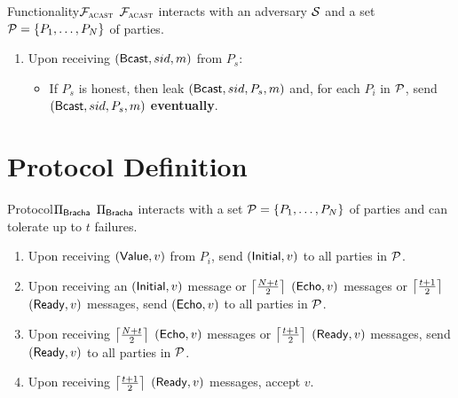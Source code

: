 \documentclass{llncs}
\begin{document}
\begin{boxdef}{Functionality}{$\mathcal{{F}}_{\textsc{acast}}$}
  $\mathcal{{F}}_{\textsc{acast}}$ interacts with an adversary $\mathcal{{S}}$ and a set $\mathcal{{P}} = \{
  P_1, \ldots, P_N \}$ of parties.
  \begin{enumerate}
    \item Upon receiving $({\sf Bcast}, sid, m)$ from $P_s$:
    
    \begin{itemize}
      \item If $P_s$ is honest, then leak $({\sf Bcast}, sid, P_s, m)$ and, for each $P_i$ in $\mathcal{{P}}$, send $({\sf
      Bcast}, sid, P_s, m)$ {\bf eventually}.
      \end{itemize}
  \end{enumerate}
\end{boxdef}

\begin{comment}
\begin{boxdef}{ILC}{$\Func{acast}$}

\end{boxdef}
\end{comment}

\section{Protocol Definition}

\begin{boxdef}{Protocol}{$\Pi_{\sf Bracha}$}
  $\Pi_{\sf Bracha}$ interacts with a set $\mathcal{{P}} = \{ P_1, \ldots, P_N \}$ of
  parties and can tolerate up to $t$ failures.
  \begin{enumerate}
    \item Upon receiving $({\sf Value}, v)$ from $P_i$, send $({\sf Initial},
  v)$ to all parties in $\mathcal{{P}}$.
  
    \item Upon receiving an $({\sf Initial}, v)$ message or
  $\left\lceil \frac{N+t}{2} \right\rceil$ $({\sf Echo}, v)$ messages or $\left\lceil \frac{t+1}{2} \right\rceil$
  $({\sf Ready}, v)$ messages, send $({\sf Echo}, v)$ to all parties in
  $\mathcal{{P}}$.

    \item Upon receiving $\left\lceil \frac{N+t}{2} \right\rceil$ $({\sf Echo}, v)$ messages or
  $\left\lceil \frac{t+1}{2} \right\rceil$ $({\sf Ready}, v)$ messages, send $({\sf Ready}, v)$ to
  all parties in $\mathcal{{P}}$.

    \item Upon receiving $\left\lceil \frac{t+1}{2} \right\rceil$ $({\sf Ready}, v)$ messages,
    accept $v$.
  \end{enumerate}
\end{boxdef}
\end{document}
